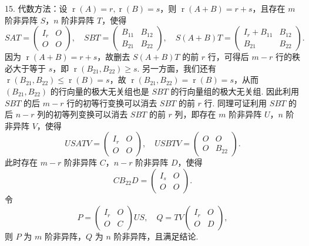 \documentclass[UTF8, 12pt, fontset=fandol, oneside]{ctexart}
\begin{document}
15. 代数方法：设 $\operatorname{r}(A)=r,\operatorname{r}(B)=s$，则 $\operatorname{r}(A+B)=r+s$，且存在 $m$ 阶非异阵 $S$，$n$ 阶非异阵 $T$，使得
\[
SAT=\left(\begin{array}{cc}I_r&O\\O&O\end{array}\right),\quad
SBT=\left(\begin{array}{cc}B_{11}&B_{12}\\B_{21}&B_{22}\end{array}\right),\quad
S(A+B)T=\left(\begin{array}{cc}I_r+B_{11}&B_{12}\\B_{21}&B_{22}\end{array}\right).
\]
因为 $\operatorname{r}(A+B)=r+s$，故删去 $S(A+B)T$ 的前 $r$ 行，可得后 $m-r$ 行的秩必大于等于 $s$，即 $\operatorname{r}(B_{21},B_{22})\ge s$. 另一方面，我们还有 $\operatorname{r}(B_{21},B_{22})\le\operatorname{r}(B)=s$，故 $\operatorname{r}(B_{21},B_{22})=\operatorname{r}(B)=s$，从而 $(B_{21},B_{22})$ 的行向量的极大无关组也是 $SBT$ 的行向量组的极大无关组. 因此利用 $SBT$ 的后 $m-r$ 行的初等行变换可以消去 $SBT$ 的前 $r$ 行. 同理可证利用 $SBT$ 的后 $n-r$ 列的初等列变换可以消去 $SBT$ 的前 $r$ 列，即存在 $m$ 阶非异阵 $U$，$n$ 阶非异阵 $V$，使得
\[
USATV=\left(\begin{array}{cc}I_r&O\\O&O\end{array}\right),\quad
USBTV=\left(\begin{array}{cc}O&O\\O&B_{22}\end{array}\right).
\]
此时存在 $m-r$ 阶非异阵 $C$，$n-r$ 阶非异阵 $D$，使得
\[
CB_{22}D=\left(\begin{array}{cc}I_s&O\\O&O\end{array}\right).
\]
令
\[
P=\left(\begin{array}{cc}I_r&O\\O&C\end{array}\right)US,\quad
Q=TV\left(\begin{array}{cc}I_r&O\\O&D\end{array}\right),
\]
则 $P$ 为 $m$ 阶非异阵，$Q$ 为 $n$ 阶非异阵，且满足结论.
\end{document}
